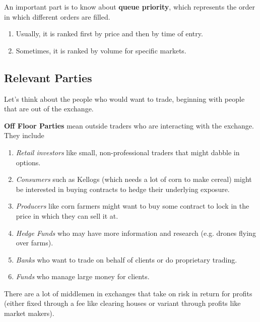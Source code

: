 \documentclass{article}
\begin{document}
    \begin{definition}
      \label{def:queue-priority}
      An important part is to know about \textbf{queue priority}, which represents the order in which different orders are filled. 
      \begin{enumerate}
        \item Usually, it is ranked first by price and then by time of entry. 
        \item Sometimes, it is ranked by volume for specific markets. 
      \end{enumerate}
    \end{definition}

  \subsection{Relevant Parties}

    Let's think about the people who would want to trade, beginning with people that are out of the exchange. 

    \begin{definition}
      \label{def:off-floor-parties}
      \textbf{Off Floor Parties} mean outside traders who are interacting with the exchange. They include 
      \begin{enumerate}
        \item \textit{Retail investors} like small, non-professional traders that might dabble in options.  
        \item \textit{Consumers} such as Kellogs (which needs a lot of corn to make cereal) might be interested in buying contracts to hedge their underlying exposure. 
        \item \textit{Producers} like corn farmers might want to buy some contract to lock in the price in which they can sell it at. 
        \item \textit{Hedge Funds} who may have more information and research (e.g. drones flying over farms). 
        \item \textit{Banks} who want to trade on behalf of clients or do proprietary trading. 
        \item \textit{Funds} who manage large money for clients. 
      \end{enumerate}
    \end{definition}

    There are a lot of middlemen in exchanges that take on risk in return for profits (either fixed through a fee like clearing houses or variant through profits like market makers). 
\end{document}
